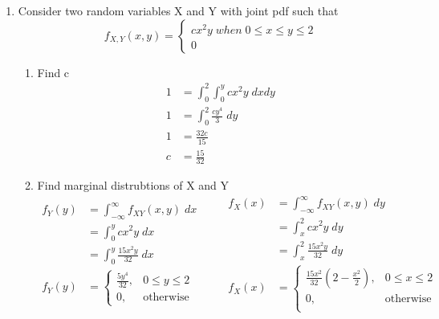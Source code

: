 \documentclass[12pt]{article}
\begin{document}
\begin{enumerate}
    \item Consider two random variables X and Y with joint pdf such that
    \begin{equation*}
    f_{X,Y}(x,y) = \begin{cases}
        cx^2y \; when \; 0 \leq x \leq y \leq 2 \\
        0
    \end{cases}
    \end{equation*}
    \begin{enumerate}
        \item Find c
        \begin{equation*}
        \begin{aligned}
            1 &= \int_{0}^{2} \int_0^y cx^2y  \; dxdy \\
            1 &= \int_{0}^{2} \frac{cy^4}{3} \; dy \\
            1 &= \frac{32c}{15} \\
            c &= \frac{15}{32}
        \end{aligned}
        \end{equation*}
        \item Find marginal distrubtions of X and Y
        \begin{equation*}
        \begin{aligned}
            f_Y(y) &= \int_{-\infty}^{\infty} f_{XY}(x,y) \; dx \\
            &= \int_{0}^{y} cx^2y \; dx \\
            &= \int_{0}^{y} \frac{15x^2y}{32} \; dx \\
            f_Y(y) &= 
            \begin{cases}
            \frac{5y^4}{32}, & 0 \leq y \leq 2\\
            0, & \text{otherwise}
            \end{cases}
        \end{aligned}
        \qquad
        \begin{aligned}
            f_X(x) &= \int_{-\infty}^{\infty} f_{XY}(x,y) \; dy \\
            &= \int_{x}^{2} cx^2y \; dy \\
            &= \int_{x}^{2} \frac{15x^2y}{32} \; dy \\
            f_X(x) &= 
            \begin{cases}
            \frac{15x^2}{32}(2-\frac{x^2}{2}), & 0 \leq x \leq 2 \\
            0, & \text{otherwise} \\
            \end{cases}
        \end{aligned}
        \end{equation*}
    \end{enumerate}
\end{enumerate}
\end{document}
